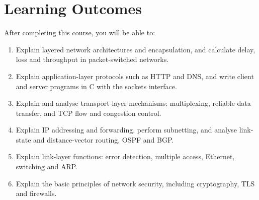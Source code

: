 \documentclass[11pt,a4paper]{article}
\begin{document}
\section{Learning Outcomes}
After completing this course, you will be able to:
\begin{enumerate}[label=LO\arabic*.]
  \item Explain layered network architectures and encapsulation, and calculate delay, loss and throughput in packet-switched networks.
  \item Explain application-layer protocols such as HTTP and DNS, and write client and server programs in C with the sockets interface.
  \item Explain and analyse transport-layer mechanisms: multiplexing, reliable data transfer, and TCP flow and congestion control.
  \item Explain IP addressing and forwarding, perform subnetting, and analyse link-state and distance-vector routing, OSPF and BGP.
  \item Explain link-layer functions: error detection, multiple access, Ethernet, switching and ARP.
  \item Explain the basic principles of network security, including cryptography, TLS and firewalls.
\end{enumerate}
\end{document}
